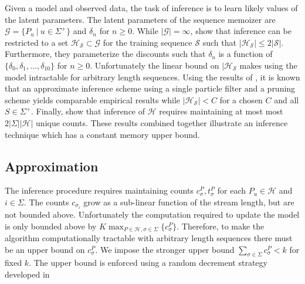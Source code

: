 Given a model and observed data,  the task of inference is to learn likely values of the latent parameters.  The latent parameters of the sequence memoizer are  $\mathcal{G} = \{P_u \ | \ u \in \Sigma^{+} \}$ and $\delta_n$ for $n \geq 0$.  While $| \mathcal{G}| = \infty$, \cite{Wood2009} show that inference can be restricted to a set $\mathcal{H_\mathcal{S}} \subset \mathcal{G}$ for the training sequence $\mathcal{S}$ such that $|\mathcal{H}_\mathcal{S} | \leq 2 |\mathcal{S}|$.  Furthermore, they parameterize the discounts such that $\delta_n$ is a function of $\{\delta_0, \delta_1, \ldots, \delta_{10} \}$ for $n \geq 0$.   Unfortunately the linear bound on $|\mathcal{H}_\mathcal{S}$ makes using the model intractable for arbitrary length sequences.  Using the results of \cite{Bartlett2010}, \cite{Gasthaus2010} it is known that an approximate inference scheme using a single particle filter and a pruning scheme yields comparable empirical results while $| \mathcal{H}_\mathcal{S}| < C$ for a chosen $C$ and all $S \in \Sigma^{+}$.  Finally, \cite{Gasthaus2011} show that inference of $\mathcal{H}$ requires maintaining at most most $2|\Sigma| |\mathcal{H}|$ unique counts.  These results combined together illustrate an inference technique which has a constant memory upper bound.


\subsection{Approximation}

The inference procedure requires maintaining counts $c^P_\sigma,t^P_\sigma$ for each $P_u \in \mathcal{H}$ and $i \in \Sigma$.  The counts $c_{\sigma_i}$ grow as a sub-linear function of the stream length, but are not bounded above.  Unfortunately the computation required to update the model is only bounded above by $K \max_{P \in \mathcal{H}, \sigma \in \Sigma} \{ c^P_\sigma \}$.  Therefore, to make the algorithm computationally tractable with arbitrary length sequences there must be an upper bound on $c^P_\sigma$.  We impose the stronger upper bound $\sum_{\sigma \in \Sigma} c_\sigma^P < k$ for fixed $k$.  The upper bound is enforced using a random decrement strategy developed in 







